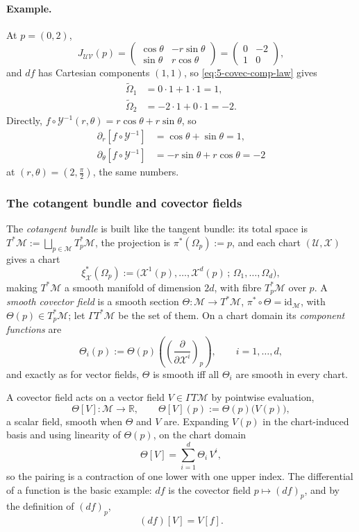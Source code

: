 \documentclass[11pt]{article}
\newcommand{\TpsM}{T_p^*\mathcal M}
\begin{document}
\paragraph{Example.} At $p=(0,2)$,
\[
J_{\mathcal{UV}}(p)=\begin{pmatrix}\cos\theta&-r\sin\theta\\\sin\theta&r\cos\theta\end{pmatrix}=\begin{pmatrix}0&-2\\1&0\end{pmatrix},
\]
and $df$ has Cartesian components $(1,1)$, so \eqref{eq:5-covec-comp-law} gives
\begin{align*}
\widetilde\Omega_1&=0\cdot1+1\cdot1=1,\\
\widetilde\Omega_2&=-2\cdot1+0\cdot1=-2.
\end{align*}
Directly, $f\circ\mathcal Y^{-1}(r,\theta)=r\cos\theta+r\sin\theta$, so
\begin{align*}
\partial_r[f\circ\mathcal Y^{-1}]&=\cos\theta+\sin\theta=1,\\
\partial_\theta[f\circ\mathcal Y^{-1}]&=-r\sin\theta+r\cos\theta=-2
\end{align*}
at $(r,\theta)=(2,\tfrac\pi2)$, the same numbers.

\subsubsection*{The cotangent bundle and covector fields}
The \emph{cotangent bundle} is built like the tangent bundle: its total space is $T^*\mathcal M:=\bigsqcup_{p\in\mathcal M}\TpsM$, the projection is $\pi^*(\Omega_p):=p$, and each chart $(\mathcal U,\mathcal X)$ gives a chart
\[
\xi^*_{\mathcal X}(\Omega_p):=\big(\mathcal X^1(p),\dots,\mathcal X^d(p)\,;\,\Omega_1,\dots,\Omega_d\big),
\]
making $T^*\mathcal M$ a smooth manifold of dimension $2d$, with fibre $\TpsM$ over $p$. A \emph{smooth covector field} is a smooth section $\Theta:\mathcal M\to T^*\mathcal M$, $\pi^*\circ\Theta=\mathrm{id}_{\mathcal M}$, with $\Theta(p)\in\TpsM$; let $\Gamma T^*\mathcal M$ be the set of them. On a chart domain its \emph{component functions} are
\[
\Theta_i(p):=\Theta(p)\!\left(\left(\frac{\partial}{\partial\mathcal X^i}\right)_p\right),\qquad i=1,\dots,d,
\]
and exactly as for vector fields, $\Theta$ is smooth iff all $\Theta_i$ are smooth in every chart.

A covector field acts on a vector field $V\in\Gamma T\mathcal M$ by pointwise evaluation,
\[
\Theta[V]:\mathcal M\to\mathbb R,\qquad \Theta[V](p):=\Theta(p)\big(V(p)\big),
\]
a scalar field, smooth when $\Theta$ and $V$ are. Expanding $V(p)$ in the chart-induced basis and using linearity of $\Theta(p)$, on the chart domain
\begin{equation}
\Theta[V]=\sum_{i=1}^d\Theta_i\,V^i,
\tag{5.4}\label{eq:5-pairing}
\end{equation}
so the pairing is a contraction of one lower with one upper index. The differential of a function is the basic example: $df$ is the covector field $p\mapsto(df)_p$, and by the definition of $(df)_p$,
\[
(df)[V]=V[f].
\]
\end{document}
